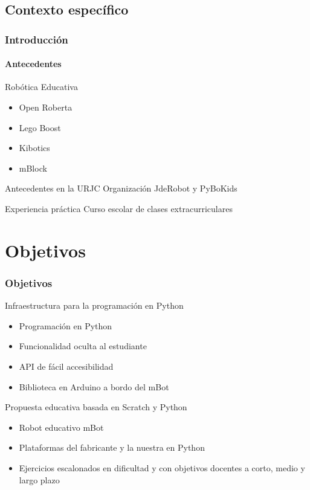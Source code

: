 \documentclass{beamer}
\begin{document}
\subsection{Contexto específico}

\begin{frame}
	\frametitle{Introducción}
\framesubtitle{Antecedentes}
\begin{block}{Robótica Educativa}
	\begin{itemize}
		\item Open Roberta
		\item Lego Boost
		\item Kibotics
		\item mBlock
	\end{itemize}
\end{block}

\begin{block}{Antecedentes en la URJC}
	Organización JdeRobot y PyBoKids
\end{block}
\begin{block}{Experiencia práctica}
	Curso escolar de clases extracurriculares
\end{block}
\end{frame}

\section{Objetivos}
\begin{frame}
\frametitle{Objetivos}
\begin{block}{Infraestructura para la programación en Python}
	\begin{itemize}
	\item Programación en Python
	\item Funcionalidad oculta al estudiante
	\item API de fácil accesibilidad
	\item Biblioteca en Arduino a bordo del mBot
	\end{itemize}
\end{block}

\begin{block}{Propuesta educativa basada en Scratch y Python}
	\begin{itemize}
		\item Robot educativo mBot
		\item Plataformas del fabricante y la nuestra en Python
		\item Ejercicios escalonados en dificultad y con objetivos docentes a corto, medio y largo plazo
	\end{itemize}
\end{block}
\end{frame}
\end{document}
